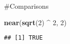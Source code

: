 \documentclass[]{article}
\newenvironment{Shaded}{\begin{snugshade}}{\end{snugshade}}
\newcommand{\DecValTok}[1]{\textcolor[rgb]{0.00,0.00,0.81}{#1}}
\newcommand{\KeywordTok}[1]{\textcolor[rgb]{0.13,0.29,0.53}{\textbf{#1}}}
\newcommand{\NormalTok}[1]{#1}
\newcommand{\OperatorTok}[1]{\textcolor[rgb]{0.81,0.36,0.00}{\textbf{#1}}}
\newcommand{\StringTok}[1]{\textcolor[rgb]{0.31,0.60,0.02}{#1}}
\begin{document}
\#Comparisons

\begin{Shaded}
\begin{Highlighting}[]
\KeywordTok{near}\NormalTok{(}\KeywordTok{sqrt}\NormalTok{(}\DecValTok{2}\NormalTok{) }\OperatorTok{^}\StringTok{ }\DecValTok{2}\NormalTok{, }\DecValTok{2}\NormalTok{)}
\end{Highlighting}
\end{Shaded}

\begin{verbatim}
## [1] TRUE
\end{verbatim}
\end{document}
